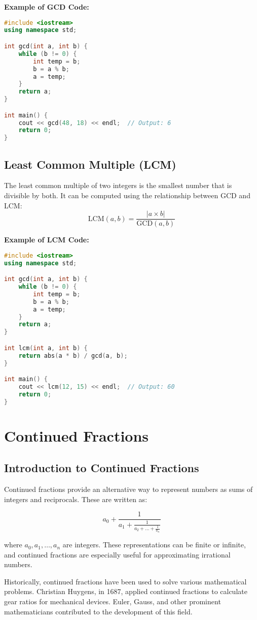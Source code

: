 \documentclass[10pt,a4paper]{article}
\begin{document}
\textbf{Example of GCD Code:}
\begin{lstlisting}[language=C++]
#include <iostream>
using namespace std;

int gcd(int a, int b) {
    while (b != 0) {
        int temp = b;
        b = a % b;
        a = temp;
    }
    return a;
}

int main() {
    cout << gcd(48, 18) << endl;  // Output: 6
    return 0;
}
\end{lstlisting}

\subsection*{Least Common Multiple (LCM)}
The least common multiple of two integers is the smallest number that is divisible by both. It can be computed using the relationship between GCD and LCM:
\[
\text{LCM}(a, b) = \frac{|a \times b|}{\text{GCD}(a, b)}
\]

\textbf{Example of LCM Code:}
\begin{lstlisting}[language=C++]
#include <iostream>
using namespace std;

int gcd(int a, int b) {
    while (b != 0) {
        int temp = b;
        b = a % b;
        a = temp;
    }
    return a;
}

int lcm(int a, int b) {
    return abs(a * b) / gcd(a, b);
}

int main() {
    cout << lcm(12, 15) << endl;  // Output: 60
    return 0;
}
\end{lstlisting}


\section*{Continued Fractions}

\subsection*{Introduction to Continued Fractions}

Continued fractions provide an alternative way to represent numbers as sums of integers and reciprocals. These are written as:

\[
a_0 + \frac{1}{a_1 + \frac{1}{a_2 + \dots + \frac{1}{a_n}}}
\]

where \(a_0, a_1, \dots, a_n\) are integers. These representations can be finite or infinite, and continued fractions are especially useful for approximating irrational numbers.

Historically, continued fractions have been used to solve various mathematical problems. Christian Huygens, in 1687, applied continued fractions to calculate gear ratios for mechanical devices. Euler, Gauss, and other prominent mathematicians contributed to the development of this field.
\end{document}
